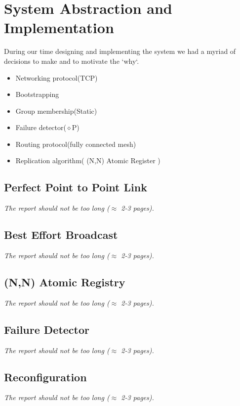 \documentclass[a4paper, 11pt]{article}
\begin{document}
\section{System Abstraction and Implementation}

During our time designing and implementing the system we had a myriad of decisions to make and to motivate the `why`.

\begin{itemize}
	\item Networking protocol(TCP)
	\item Bootstrapping
	\item Group membership(Static)
	\item Failure detector($\diamond$P)
	\item Routing protocol(fully connected mesh)
	\item Replication algorithm( (N,N) Atomic Register )
\end{itemize}

\subsection{Perfect Point to Point Link}

\textit{The report should not be too long ($\approx$ 2-3 pages).}

\subsection{Best Effort Broadcast}

\textit{The report should not be too long ($\approx$ 2-3 pages).}

\subsection{(N,N) Atomic Registry}

\textit{The report should not be too long ($\approx$ 2-3 pages).}

\subsection{Failure Detector}

\textit{The report should not be too long ($\approx$ 2-3 pages).}

\subsection{Reconfiguration}
\textit{The report should not be too long ($\approx$ 2-3 pages).}
\end{document}
